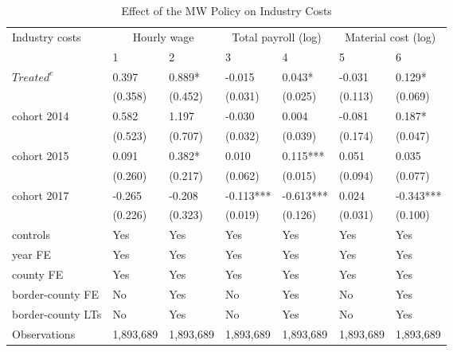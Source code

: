 \begin{table}[H]
    \centering
    \caption{Effect of the MW Policy on Industry Costs}
    \label{tab:baseline-industry-costs}
    \begin{tabular}{@{}lllllll@{}}
        \toprule\toprule
        Industry costs & \multicolumn{2}{c}{Hourly wage} & \multicolumn{2}{c}{Total payroll (log)} & \multicolumn{2}{c}{Material cost (log)} \\
        \cmidrule(lr){2-3}\cmidrule(lr){4-5}\cmidrule(lr){6-7}
        & 1         & 2         & 3         & 4         & 5         & 6         \\ \midrule
        $Treated^{e}$     & 0.397     & 0.889*    & -0.015    & 0.043*    & -0.031    & 0.129*    \\
        & (0.358)   & (0.452)   & (0.031)   & (0.025)   & (0.113)   & (0.069)   \\
        cohort 2014       & 0.582     & 1.197     & -0.030    & 0.004     & -0.081    & 0.187*    \\
        & (0.523)   & (0.707)   & (0.032)   & (0.039)   & (0.174)   & (0.047)   \\
        cohort 2015       & 0.091     & 0.382*    & 0.010     & 0.115***  & 0.051     & 0.035     \\
        & (0.260)   & (0.217)   & (0.062)   & (0.015)   & (0.094)   & (0.077)   \\
        cohort 2017       & -0.265    & -0.208    & -0.113*** & -0.613*** & 0.024     & -0.343*** \\
        & (0.226)   & (0.323)   & (0.019)   & (0.126)   & (0.031)   & (0.100)   \\
        controls          & Yes       & Yes       & Yes       & Yes       & Yes       & Yes       \\
        year FE           & Yes       & Yes       & Yes       & Yes       & Yes       & Yes       \\
        county FE         & Yes       & Yes       & Yes       & Yes       & Yes       & Yes       \\
        border-county FE  & No        & Yes       & No        & Yes       & No        & Yes       \\
        border-county LTs & No        & Yes       & No        & Yes       & No        & Yes       \\ \midrule
        Observations      & 1,893,689 & 1,893,689 & 1,893,689 & 1,893,689 & 1,893,689 & 1,893,689 \\

\end{tabular}
\end{table}
